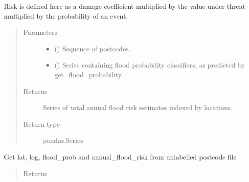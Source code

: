 \documentclass[letterpaper,10pt,english]{sphinxmanual}
\begin{document}
\begin{fulllineitems}
\begin{fulllineitems}
\label{\detokenize{index:flood_tool.Tool.get_annual_flood_risk}}
\sphinxAtStartPar
Risk is defined here as a damage coefficient multiplied by the
value under threat multiplied by the probability of an event.
\begin{quote}\begin{description}
\item[{Parameters}] \leavevmode\begin{itemize}
\item {} 
\sphinxAtStartPar
{} () \textendash{} Sequence of postcodes.

\item {} 
\sphinxAtStartPar
{} (\sphinxstyleliteralemphasis{\sphinxupquote{ (}}\sphinxstyleliteralemphasis{\sphinxupquote{)}}) \textendash{} Series containing flood probability classifiers, as
predicted by get\_flood\_probability.

\end{itemize}

\item[{Returns}] \leavevmode
\sphinxAtStartPar
Series of total annual flood risk estimates indexed by locations.

\item[{Return type}] \leavevmode
\sphinxAtStartPar
pandas.Series

\end{description}\end{quote}

\end{fulllineitems}


\begin{fulllineitems}
\label{\detokenize{index:flood_tool.Tool.get_combined_data}}
\sphinxAtStartPar
Get lat, log, flood\_prob and annual\_flood\_risk from unlabelled
postcode file
\begin{quote}\begin{description}
\item[{Returns}] \leavevmode
\sphinxAtStartPar



\end{description}
\end{quote}
\end{fulllineitems}
\end{fulllineitems}
\end{document}
